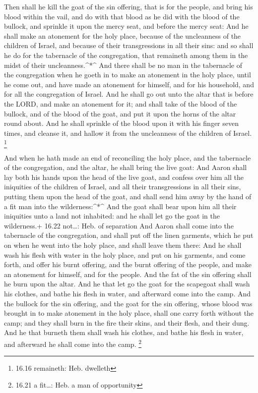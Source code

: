  Then shall he kill the goat of the sin offering, that is
for the people, and bring his blood within the vail, and do with that
blood as he did with the blood of the bullock, and sprinkle it upon the
mercy seat, and before the mercy seat:  And he shall make
an atonement for the holy place, because of the uncleanness of the
children of Israel, and because of their transgressions in all their
sins: and so shall he do for the tabernacle of the congregation, that
remaineth among them in the midst of their uncleanness.\^{}*\^{}
 And there shall be no man in the tabernacle of the
congregation when he goeth in to make an atonement in the holy place,
until he come out, and have made an atonement for himself, and for his
household, and for all the congregation of Israel.  And he
shall go out unto the altar that is before the LORD, and make an
atonement for it; and shall take of the blood of the bullock, and of the
blood of the goat, and put it upon the horns of the altar round about.
 And he shall sprinkle of the blood upon it with his finger
seven times, and cleanse it, and hallow it from the uncleanness of the
children of Israel. \footnote{16.16 remaineth: Heb. dwelleth}

 And when he hath made an end of reconciling the holy
place, and the tabernacle of the congregation, and the altar, he shall
bring the live goat:  And Aaron shall lay both his hands
upon the head of the live goat, and confess over him all the iniquities
of the children of Israel, and all their transgressions in all their
sins, putting them upon the head of the goat, and shall send him away by
the hand of a fit man into the wilderness:\^{}*\^{}  And
the goat shall bear upon him all their iniquities unto a land not
inhabited: and he shall let go the goat in the wilderness.+ 16.22
not\ldots: Heb. of separation  And Aaron shall come into
the tabernacle of the congregation, and shall put off the linen
garments, which he put on when he went into the holy place, and shall
leave them there:  And he shall wash his flesh with water
in the holy place, and put on his garments, and come forth, and offer
his burnt offering, and the burnt offering of the people, and make an
atonement for himself, and for the people.  And the fat of
the sin offering shall he burn upon the altar.  And he that
let go the goat for the scapegoat shall wash his clothes, and bathe his
flesh in water, and afterward come into the camp.  And the
bullock for the sin offering, and the goat for the sin offering, whose
blood was brought in to make atonement in the holy place, shall one
carry forth without the camp; and they shall burn in the fire their
skins, and their flesh, and their dung.  And he that
burneth them shall wash his clothes, and bathe his flesh in water, and
afterward he shall come into the camp. \footnote{16.21 a fit\ldots: Heb.
  a man of opportunity}

